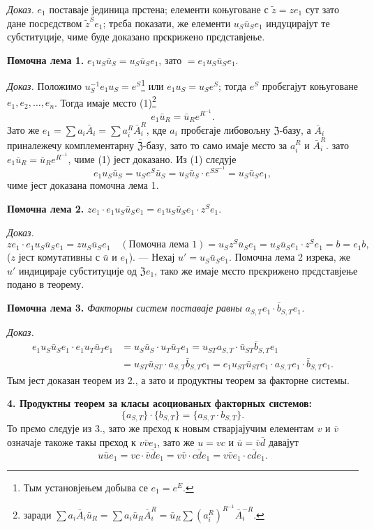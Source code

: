 \documentclass[11pt]{article}
\newcommand{\srcfn}[2]{\footnote{#2}}
\begin{document}
\noindent\emph{Доказ.} \(e_1\) поставаје јединица прстена; елементи коњуговане с \(\tilde z=ze_1\) сут зато дане посрєдством \(\tilde z^Se_1\); трєба показати, же елементи \(u_S\bar u_Se_1\) индуцирајут те субституције, чиме буде доказано прєкрижено прєдставјење.

\noindent\textbf{Помочна лема 1.} \(e_1u_S\bar u_S=u_S\bar u_Se_1\), зато \(=e_1u_S\bar u_Se_1\).

\noindent\emph{Доказ.} Положимо \(u_S^{-1}e_1u_S=e^S\)\srcfn{1}{Тым установјењем добыва се \(e_1=e^E\).} или \(e_1u_S=u_Se^S\); тогда \(e^S\) пробєгајут коњуговане \(e_1,e_2,\ldots,e_n\). Тогда имаје мєсто (1)\srcfn{2}{заради \(\sum a_i\bar A_i\bar u_R=\sum a_i\bar u_R\bar A_i^R=\bar u_R\sum(a_i^R)^{R^{-1}}\bar A_i^{-R}\).}
\[
e_1\bar u_R=\bar u_Re^{R^{-1}}.
\]
Зато же \(e_1=\sum a_i\bar A_i=\sum a_i^R\bar A_i^R\), кде \(a_i\) пробєгаје либовољну \(\mathfrak Z\)-базу, а \(\bar A_i\) приналежечу комплементарну \(\overline{\mathfrak Z}\)-базу, зато то само имаје мєсто за \(a_i^R\) и \(\bar A_i^R\). зато \(e_1\bar u_R=\bar u_Re^{R^{-1}}\), чиме (1) јест доказано. Из (1) слєдује
\[
e_1u_S\bar u_S=u_Se^S\bar u_S=u_S\bar u_S\cdot e^{SS^{-1}}=u_S\bar u_Se_1,
\]
чиме јест доказана помочна лема 1.

\noindent\textbf{Помочна лема 2.} \(ze_1\cdot e_1u_S\bar u_Se_1=e_1u_S\bar u_Se_1\cdot z^Se_1\).

\noindent\emph{Доказ.} 
\[
ze_1\cdot e_1u_S\bar u_Se_1
=zu_S\bar u_Se_1\quad(\text{Помочна лема 1})
=u_Sz^S\bar u_Se_1
=u_S\bar u_Se_1\cdot z^Se_1
=b=e_1b,
\]
(\(z\) јест комутативны с \(\bar u\) и \(e_1\)). --- Нехај \(u'=u_S\bar u_Se_1\). Помочна лема 2 изрека, же \(u'\) индицираје субституције од \(\mathfrak Ze_1\), тако же имаје мєсто прєкрижено прєдставјење подано в теорему.

\noindent\textbf{Помочна лема 3.} \emph{Факторны систем поставаје равны \(a_{S,T}e_1\cdot\bar b_{S,T}e_1\).}

\noindent\emph{Доказ.}
\[
\begin{aligned}
e_1u_S\bar u_Se_1\cdot e_1u_T\bar u_Te_1
&=u_S\bar u_S\cdot u_T\bar u_Te_1
 =u_{ST}a_{S,T}\cdot\bar u_{ST}\bar b_{S,T}e_1\\
&=u_{ST}\bar u_{ST}\cdot a_{S,T}\bar b_{S,T}e_1
 =e_1u_{ST}\bar u_{ST}e_1\cdot a_{S,T}e_1\cdot\bar b_{S,T}e_1.
\end{aligned}
\]
Тым јест доказан теорем из 2., а зато и продуктны теорем за факторне системы.

\noindent\textbf{4. Продуктны теорем за класы асоциованых факторных системов:}
\[
\{a_{S,T}\}\cdot\{b_{S,T}\}=\{a_{S,T}\cdot b_{S,T}\}.
\]
То прємо слєдује из 3., зато же прєход к новым стварјајучим елементам \(v\) и \(\bar v\) означаје такоже такы прєход к \(v\bar ve_1\), зато же \(u=vc\) и \(\bar u=\bar v\bar d\) давајут
\[
u\bar ue_1=vc\cdot\bar v\bar de_1=v\bar v\cdot c\bar de_1=v\bar ve_1\cdot c\bar de_1.
\]
\end{document}
